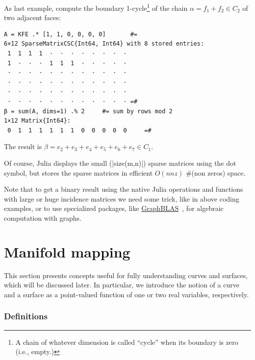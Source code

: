 \begin{coding}[Algebraic computation of FE = $\delta_1$]
\begin{coding} As last example, compute the boundary 1-cycle\footnote{A chain of whatever dimension is called “cycle” when its boundary is zero (i.e., empty.)} of the chain $\alpha = f_1 + f_2 \in C_2$ of two adjacent faces:
\begin{lstlisting}[language=JuliaLocal, style=julia, mathescape=true]
A = KFE .* [1, 1, 0, 0, 0, 0]		#=
6×12 SparseMatrixCSC{Int64, Int64} with 8 stored entries:
 1  1  1  1  ⋅  ⋅  ⋅  ⋅  ⋅  ⋅  ⋅  ⋅
 1  ⋅  ⋅  ⋅  1  1  1  ⋅  ⋅  ⋅  ⋅  ⋅
 ⋅  ⋅  ⋅  ⋅  ⋅  ⋅  ⋅  ⋅  ⋅  ⋅  ⋅  ⋅
 ⋅  ⋅  ⋅  ⋅  ⋅  ⋅  ⋅  ⋅  ⋅  ⋅  ⋅  ⋅
 ⋅  ⋅  ⋅  ⋅  ⋅  ⋅  ⋅  ⋅  ⋅  ⋅  ⋅  ⋅
 ⋅  ⋅  ⋅  ⋅  ⋅  ⋅  ⋅  ⋅  ⋅  ⋅  ⋅  ⋅	=#
β = sum(A, dims=1) .% 2 	#= sum by rows mod 2
1×12 Matrix{Int64}:
 0  1  1  1  1  1  1  0  0  0  0  0		=#
\end{lstlisting}
The result is $\beta = e_2+ e_3+ e_4+ e_5+ e_6+ e_7 \in C_1$. 
\end{coding}

\begin{remark} 
Of course, Julia displays the small (|size(m,n)|) sparse matrices using the dot symbol, but stores the sparse matrices in efficient $O(nnz)$ $\#$(non zeros) space.
\end{remark}
\begin{remark} 
Note that to get a binary result using the native Julia operations and functions with large or huge incidence matrices we need some trick, like in above coding examples, or to use specialized packages, like \href{https://github.com/GraphBLAS/GraphBLAS-Pointers}{GraphBLAS}~\cite{DBLP:conf/hpec/KepnerABBFGHKLM16}, for algebraic computation with graphs.
\end{remark}


\section{ Manifold mapping}\label{sect:5-3}

This section presents concepts useful for fully understanding curves and surfaces, which will be discussed later. In particular, we introduce the notion of a curve and a surface as a point-valued function of one or two real variables, respectively.

\subsubsection*{ Definitions}\label{sect:5-3-1}


\end{coding}
